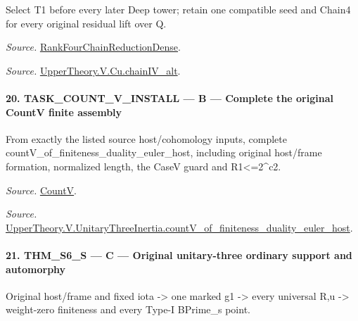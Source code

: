 Select T1 before every later Deep tower; retain one compatible seed and Chain4 for every original residual lift over Q.

\emph{Source.} \href{https://github.com/CocoSgt/riemann-hypothesis-lean/blob/7cbf7a0c32fca1badf05931879a37c3f8a2b03b4/src/Development/AutomorphicArithmetic/AutomorphicVarieties/ModularityArgument/ThresholdArguments/DenseThresholdCases/PromodularityCaseThree.lean#L33-L39}{RankFourChainReductionDense}.

\emph{Source.} \href{https://github.com/CocoSgt/riemann-hypothesis-lean/blob/7cbf7a0c32fca1badf05931879a37c3f8a2b03b4/src/Development/AutomorphicArithmetic/AutomorphicVarieties/ModularityArgument/ThresholdArguments/DenseThresholdCases/CuPChainIV.lean#L16-L82}{UpperTheory.V.Cu.chainIV\_\allowbreak alt}.



\paragraph{20. TASK\_\allowbreak COUNT\_\allowbreak V\_\allowbreak INSTALL — B — Complete the original CountV finite assembly}

From exactly the listed source host/cohomology inputs, complete countV\_\allowbreak of\_\allowbreak finiteness\_\allowbreak duality\_\allowbreak euler\_\allowbreak host, including original host/frame formation, normalized length, the CaseV guard and R1<=2\textasciicircum{}c2.

\emph{Source.} \href{https://github.com/CocoSgt/riemann-hypothesis-lean/blob/7cbf7a0c32fca1badf05931879a37c3f8a2b03b4/src/Development/AutomorphicArithmetic/AutomorphicVarieties/HeightAndVanishing/Counts.lean#L69-L69}{CountV}.

\emph{Source.} \href{https://github.com/CocoSgt/riemann-hypothesis-lean/blob/7cbf7a0c32fca1badf05931879a37c3f8a2b03b4/src/Development/AutomorphicArithmetic/AutomorphicVarieties/ModularityArgument/ThresholdArguments/DenseThresholdCases/CountVOf.lean#L33-L60}{UpperTheory.V.UnitaryThreeInertia.countV\_\allowbreak of\_\allowbreak finiteness\_\allowbreak duality\_\allowbreak euler\_\allowbreak host}.



\paragraph{21. THM\_\allowbreak S6\_\allowbreak S — C — Original unitary-three ordinary support and automorphy}

Original host/frame and fixed iota -> one marked g1 -> every universal R,u -> weight-zero finiteness and every Type-I BPrime\_\allowbreak s point.

